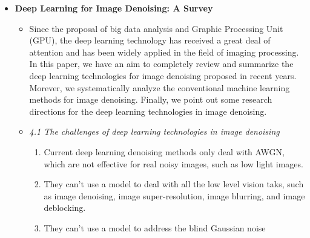 \documentclass[12pt]{article}
\begin{document}
\begin{itemize}
\item \textbf{Deep Learning for Image Denoising: A Survey} \cite{tian2018deep}
  \begin{itemize}
  \item Since the proposal of big data analysis and Graphic Processing
    Unit (GPU), the deep learning technology has received a great deal
    of attention and has been widely applied in the field of imaging
    processing. In this paper, we have an aim to completely review and
    summarize the deep learning technologies for image denoising proposed
    in recent years. Morever, we systematically analyze the conventional
    machine learning methods for image denoising. Finally, we point out
    some research directions for the deep learning technologies in image
    denoising.
  \item \textit{4.1 The challenges of deep learning technologies in
    image denoising}
    \begin{enumerate}
    \item Current deep learning denoising methods only deal with AWGN,
      which are not effective for real noisy images, such as low light
      images.
    \item They can't use a model to deal with all the low level vision
      taks, such as image denoising, image super-resolution, image
      blurring, and image deblocking.
    \item They can't use a model to address the blind Gaussian noise
    \end{enumerate}
  \end{itemize}


\end{itemize}
\end{document}
